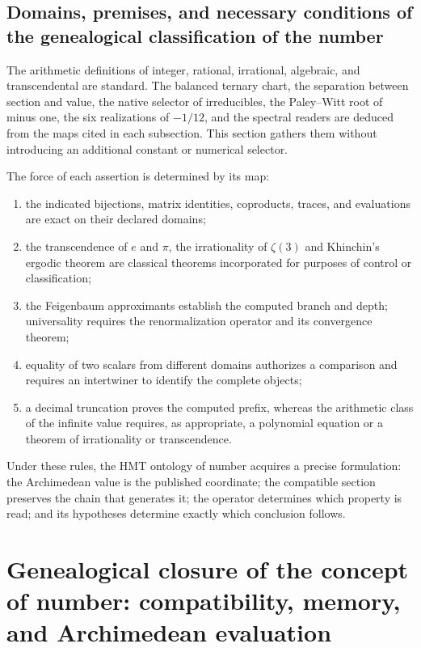 \subsection{Domains, premises, and necessary conditions of the genealogical classification of the number}

The arithmetic definitions of integer, rational, irrational, algebraic, and
transcendental are standard. The balanced ternary chart, the separation between
section and value, the native selector of irreducibles, the Paley--Witt root of
minus one, the six realizations of \(-1/12\), and the spectral readers are
deduced from the maps cited in each subsection. This section gathers them without
introducing an additional constant or numerical selector.

The force of each assertion is determined by its map:
\begin{enumerate}
\item the indicated bijections, matrix identities, coproducts, traces,
and evaluations are exact on their declared domains;
\item the transcendence of \(e\) and \(\pi\), the irrationality of
      \(\zeta(3)\) and Khinchin's ergodic theorem are classical theorems
      incorporated for purposes of control or classification;
\item the Feigenbaum approximants establish the computed branch and
      depth; universality requires the renormalization operator and
      its convergence theorem;
\item equality of two scalars from different domains authorizes a
comparison and requires an intertwiner to identify the complete
objects;
\item a decimal truncation proves the computed prefix, whereas the
      arithmetic class of the infinite value requires, as appropriate, a
      polynomial equation or a theorem of irrationality or transcendence.
\end{enumerate}

Under these rules, the HMT ontology of number acquires a precise formulation: the Archimedean value is the published coordinate; the compatible section preserves the chain that generates it; the operator determines which property is read; and its hypotheses determine exactly which conclusion follows.


\section[Genealogical closure of the concept of number]{Genealogical closure of the concept of number: compatibility, memory, and Archimedean evaluation}
\label{p3-83-c44-s2:chap:cierre-genealogico-numero}

